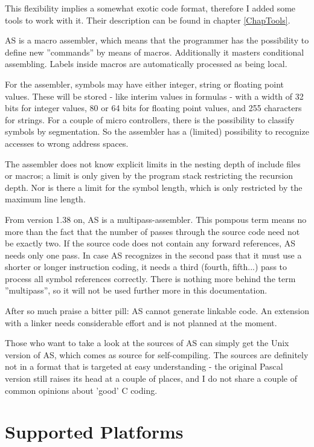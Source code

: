\documentclass[12pt,twoside]{report}
\begin{document}
This flexibility implies a somewhat exotic code format, therefore I
added some tools to work with it. Their description can be found in
chapter \ref{ChapTools}.

AS is a macro assembler, which means that the programmer has the
possibility to define new ''commands'' by means of macros.
Additionally it masters conditional assembling.  Labels inside macros
are automatically processed as being local.

For the assembler, symbols may have either integer, string or floating
point values.  These will be stored - like interim values in formulas -
with a width of 32 bits for integer values, 80 or 64 bits for floating
point values, and 255 characters for strings.  For a couple of micro
controllers, there is the possibility to classify symbols by segmentation.
So the assembler has a (limited) possibility to recognize accesses to
wrong address spaces.

The assembler does not know explicit limits in the nesting depth of
include files or macros; a limit is only given by the program stack
restricting the recursion depth.  Nor is there a limit for the
symbol length, which is only restricted by the maximum line length.

From version 1.38 on, AS is a multipass-assembler.  This pompous term
means no more than the fact that the number of passes through the
source code need not be exactly two. If the source code does not
contain any forward references, AS needs only one pass.  In case AS
recognizes in the second pass that it must use a shorter or longer
instruction coding, it needs a third (fourth, fifth...) pass to
process all symbol references correctly. There is nothing more behind
the term ''multipass'', so it will not be used further more in this
documentation.

After so much praise a bitter pill: AS cannot generate linkable code.
An extension with a linker needs considerable effort and is not planned
at the moment.

Those who want to take a look at the sources of AS can simply get the
Unix version of AS, which comes as source for self-compiling.  The sources
are definitely not in a format that is targeted at easy understanding -
the original Pascal version still raises its head at a couple of places,
and I do not share a couple of common opinions about 'good' C coding.


\section{Supported Platforms}
\end{document}
